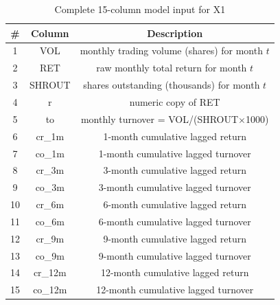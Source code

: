 \begin{table}[H]\centering
\caption{Complete 15-column model input for X1}\label{tab:b3-model-input-columns}
\begin{tabular}{ccc}\toprule
\# & Column & Description \\\midrule
1 & VOL & monthly trading volume (shares) for month $t$ \\
2 & RET & raw monthly total return for month $t$ \\
3 & SHROUT & shares outstanding (thousands) for month $t$ \\
4 & r & numeric copy of RET \\
5 & to & monthly turnover = VOL/(SHROUT$\times$1000) \\
6 & cr\_1m & 1-month cumulative lagged return \\
7 & co\_1m & 1-month cumulative lagged turnover \\
8 & cr\_3m & 3-month cumulative lagged return \\
9 & co\_3m & 3-month cumulative lagged turnover \\
10 & cr\_6m & 6-month cumulative lagged return \\
11 & co\_6m & 6-month cumulative lagged turnover \\
12 & cr\_9m & 9-month cumulative lagged return \\
13 & co\_9m & 9-month cumulative lagged turnover \\
14 & cr\_12m & 12-month cumulative lagged return \\
15 & co\_12m & 12-month cumulative lagged turnover \\
\bottomrule\end{tabular}
\end{table}
